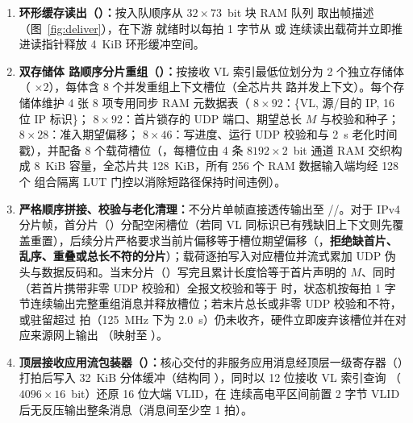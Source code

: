 \begin{enumerate}[leftmargin=2em,itemsep=1pt]
  \item \textbf{环形缓存读出（）：}按入队顺序从 $32\times 73$~bit 块 RAM 队列  取出帧描述（图~\ref{fig:deliver}），在下游  就绪时以每拍 1 字节从  或  连续读出载荷并立即推进读指针释放 4~KiB 环形缓冲空间。
  \item \textbf{双存储体 \ReasmContexts{} 路顺序分片重组（）：}按接收 VL 索引最低位划分为 2 个独立存储体（ $\times 2$），每体含 8 个并发重组上下文槽位（全芯片共 \ReasmContexts{} 路并发上下文）。每个存储体维护 4 张 8 项专用同步 RAM 元数据表（ $8\times 92$：\{VL, 源/目的 IP, 16 位 IP 标识\}； $8\times 92$：首片锁存的 UDP 端口、期望总长 $M$ 与校验和种子； $8\times 28$：准入期望偏移； $8\times 46$：写进度、运行 UDP 校验和与 2~s 老化时间戳），并配备 8 个载荷槽位（，每槽位由 4 条 $8192\times 2$~bit 通道 RAM 交织构成 8~KiB 容量，全芯片共 128~KiB，所有 256 个 RAM 数据输入端均经 128 个  组合隔离 LUT 门控以消除短路径保持时间违例）。
  \item \textbf{严格顺序拼接、校验与老化清理：}不分片单帧直接透传输出至 //。对于 IPv4 分片帧，首分片（）分配空闲槽位（若同 VL 同标识已有残缺旧上下文则先覆盖重置），后续分片严格要求当前片偏移等于槽位期望偏移（，\textbf{拒绝缺首片、乱序、重叠或总长不符的分片}）；载荷逐拍写入对应槽位并流式累加 UDP 伪头与数据反码和。当末分片（）写完且累计长度恰等于首片声明的 $M$、同时（若首片携带非零 UDP 校验和）全报文校验和等于  时，状态机按每拍 1 字节连续输出完整重组消息并释放槽位；若末片总长或非零 UDP 校验和不符，或驻留超过  拍（125~MHz 下为 $2.0$~s）仍未收齐，硬件立即废弃该槽位并在对应来源网上输出 （映射至 ）。
  \item \textbf{顶层接收应用流包装器（）：}核心交付的非服务应用消息经顶层一级寄存器（）打拍后写入 32~KiB 分体缓冲（结构同 ），同时以 12 位接收 VL 索引查询 （$4096\times 16$~bit）还原 16 位大端 VLID，在  连续高电平区间前置 2 字节 VLID 后无反压输出整条消息（消息间至少空 1 拍）。
\end{enumerate}



